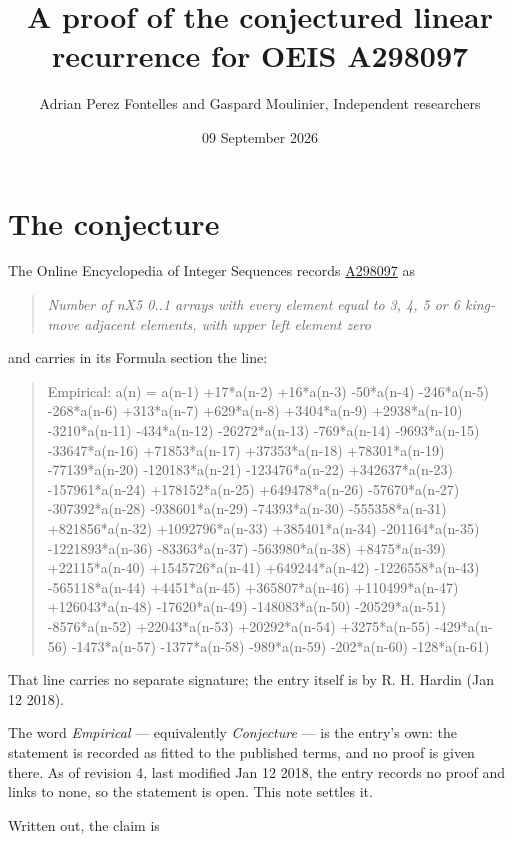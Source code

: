 \documentclass[11pt]{article}
\title{A proof of the conjectured linear recurrence for OEIS A298097}
\author{Adrian Perez Fontelles and Gaspard Moulinier, Independent researchers}
\date{09 September 2026}
\theoremstyle{definition}
\begin{document}
\maketitle
\section{The conjecture}

The Online Encyclopedia of Integer Sequences records \href{https://oeis.org/A298097}{A298097} as

\begin{quote}\itshape Number of nX5 0..1 arrays with every element equal to 3, 4, 5 or 6 king-move adjacent elements, with upper left element zero\end{quote}

and carries in its Formula section the line:

\begin{quote}\ttfamily Empirical: a(n) = a(n-1) +17*a(n-2) +16*a(n-3) -50*a(n-4) -246*a(n-5) -268*a(n-6) +313*a(n-7) +629*a(n-8) +3404*a(n-9) +2938*a(n-10) -3210*a(n-11) -434*a(n-12) -26272*a(n-13) -769*a(n-14) -9693*a(n-15) -33647*a(n-16) +71853*a(n-17) +37353*a(n-18) +78301*a(n-19) -77139*a(n-20) -120183*a(n-21) -123476*a(n-22) +342637*a(n-23) -157961*a(n-24) +178152*a(n-25) +649478*a(n-26) -57670*a(n-27) -307392*a(n-28) -938601*a(n-29) -74393*a(n-30) -555358*a(n-31) +821856*a(n-32) +1092796*a(n-33) +385401*a(n-34) -201164*a(n-35) -1221893*a(n-36) -83363*a(n-37) -563980*a(n-38) +8475*a(n-39) +22115*a(n-40) +1545726*a(n-41) +649244*a(n-42) -1226558*a(n-43) -565118*a(n-44) +4451*a(n-45) +365807*a(n-46) +110499*a(n-47) +126043*a(n-48) -17620*a(n-49) -148083*a(n-50) -20529*a(n-51) -8576*a(n-52) +22043*a(n-53) +20292*a(n-54) +3275*a(n-55) -429*a(n-56) -1473*a(n-57) -1377*a(n-58) -989*a(n-59) -202*a(n-60) -128*a(n-61)\end{quote}

That line carries no separate signature; the entry itself is by R. H. Hardin (Jan 12 2018).

The word {\itshape Empirical} --- equivalently {\itshape Conjecture} --- is the entry's own: the statement is recorded as fitted to the published terms, and no proof is given there. As of revision 4, last modified Jan 12 2018, the entry records no proof and links to none, so the statement is open. This note settles it.

Written out, the claim is
\end{document}
